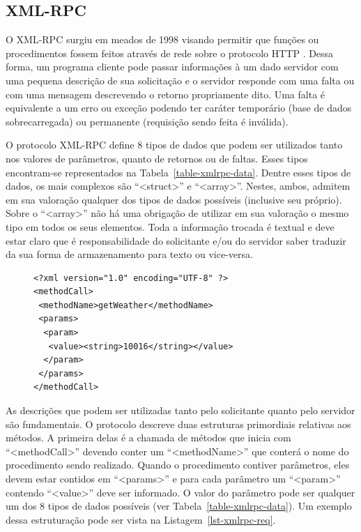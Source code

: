 \subsection{XML-RPC} \label{sec-protocolo-xmlrpc}

O XML-RPC surgiu em meados de 1998 visando permitir que funções ou procedimentos
fossem feitos através de rede sobre o protocolo HTTP \cite{cerami2002web}. Dessa
forma, um programa cliente
pode passar informações à um dado servidor com uma pequena descrição de sua
solicitação e o servidor responde com uma falta ou com uma mensagem descrevendo
o retorno propriamente dito. Uma falta é equivalente a um erro ou exceção podendo
ter caráter temporário (base de dados sobrecarregada) ou permanente (requisição
sendo feita é inválida).

O protocolo XML-RPC define 8 tipos de dados que podem ser utilizados
tanto nos valores de parâmetros, quanto de retornos ou de faltas. Esses
tipos encontram-se representados na Tabela~\ref{table-xmlrpc-data}. Dentre
esses tipos de dados, os mais complexos são ``<struct>'' e ``<array>''. Nestes,
ambos, admitem em sua valoração qualquer dos tipos de dados possíveis (inclusive
seu próprio). Sobre o ``<array>'' não há uma obrigação de utilizar em
sua valoração o mesmo tipo em todos os seus elementos. Toda a informação trocada
é textual e deve estar claro que é responsabilidade do solicitante e/ou do servidor saber
traduzir da sua forma de armazenamento para texto ou vice-versa.

\lstset{linewidth=75mm}
\begin{figure}
    \begin{minipage}{75mm}
	\begin{lstlisting}[frame=trbl, caption=Exemplo de chamada XML-RPC com os cabeçalhos HTTP sendo omitidos \cite{cerami2002web}., label=lst-xmlrpc-req]
<?xml version="1.0" encoding="UTF-8" ?>
<methodCall>
 <methodName>getWeather</methodName>
 <params>
  <param>
   <value><string>10016</string></value>
  </param>
 </params>
</methodCall>
	\end{lstlisting}
	\end{minipage}
\end{figure}

As descrições que podem ser utilizadas tanto pelo solicitante quanto pelo servidor
são fundamentais. O protocolo descreve duas estruturas primordiais relativas aos
métodos. A primeira delas é a chamada de métodos que inicia com ``<methodCall>''
devendo conter um ``<methodName>'' que conterá o nome do procedimento sendo
realizado. Quando o procedimento contiver parâmetros, eles devem estar contidos em
``<params>'' e para cada parâmetro um ``<param>'' contendo ``<value>'' deve
ser informado. O valor do parâmetro pode ser qualquer um dos 8 tipos
de dados possíveis (ver Tabela~\ref{table-xmlrpc-data}).
Um exemplo dessa estruturação pode ser vista na Listagem~\ref{lst-xmlrpc-req}.

